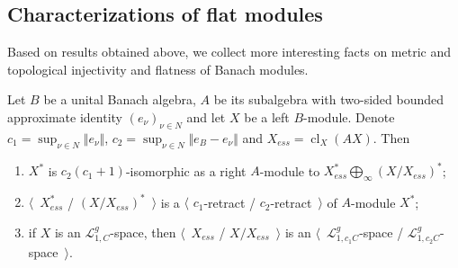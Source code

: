 
\subsection{
    Characterizations of flat modules}\label{SubSectionCharacterizationsOfFlatModules}

Based on results obtained above, we collect more interesting facts on metric and
topological injectivity and flatness of Banach modules.

\begin{proposition}\label{DualBanModDecomp} Let $B$ be a unital Banach algebra,
$A$ be its subalgebra with two-sided bounded approximate identity
${(e_\nu)}_{\nu\in N}$ and let $X$ be a left $B$-module. 
Denote $c_1=\sup_{\nu\in N}\Vert e_\nu\Vert$, 
$c_2=\sup_{\nu\in N}\Vert e_B-e_\nu\Vert$ and $X_{ess}=\operatorname{cl}_X(AX)$.
Then 

\begin{enumerate}[label = (\roman*)]
    \item $X^*$ is $c_2(c_1+1)$-isomorphic as a right $A$-module to
    $X_{ess}^*\bigoplus_\infty {(X/X_{ess})}^*$;

    \item $\langle$~$X_{ess}^*$ / ${(X/X_{ess})}^*$~$\rangle$ is a $\langle$
    $c_1$-retract / $c_2$-retract~$\rangle$ of $A$-module $X^*$;

    \item if $X$ is an $\mathscr{L}_{1,C}^g$-space, then $\langle$~$X_{ess}$ /
    $X/X_{ess}$~$\rangle$ is an $\langle$~$\mathscr{L}_{1,c_1C}^g$-space /
    $\mathscr{L}_{1,c_2C}^g$-space~$\rangle$.
\end{enumerate}

\end{proposition}
